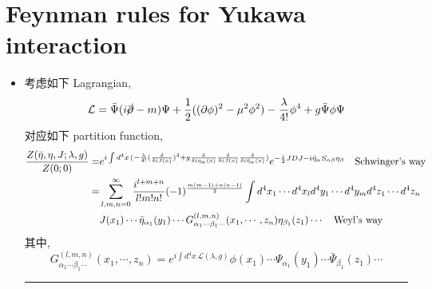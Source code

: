 \section{Feynman rules for Yukawa interaction}
\begin{itemize}
	\item 考虑如下 Lagrangian,
	\begin{equation}
		\mathcal{L} = \bar{\Psi} (i \cancel{\partial} - m) \Psi + \frac{1}{2} ((\partial \phi)^2 - \mu^2 \phi^2) - \frac{\lambda}{4!} \phi^4 + g \bar{\Psi} \phi \Psi
	\end{equation}
	对应如下 partition function,
	\begin{align}
		\frac{Z(\bar{\eta}, \eta, J; \lambda, g)}{Z(0; 0)} =& e^{i \int d^4 x \, (- \frac{\lambda}{4!} (\frac{\delta}{\delta i J(x)})^4 + g \frac{\delta}{\delta i \eta_\alpha(x)} \frac{\delta}{\delta i J(x)} \frac{\delta}{\delta i \bar{\eta}_\alpha(x)})} e^{- \frac{i}{2} J D J - i \bar{\eta}_\alpha S_{\alpha \beta} \eta_\beta} \quad \text{Schwinger's way} \notag \\
		=& \sum_{l, m, n = 0}^\infty \frac{i^{l + m + n}}{l! m! n!} (- 1)^{\frac{m (m - 1) + n (n - 1)}{2}} \int d^4 x_1 \cdots d^4 x_l d^4 y_1 \cdots d^4 y_m d^4 z_1 \cdots d^4 z_n \notag \\
		& J(x_1) \cdots \bar{\eta}_{\alpha_1}(y_1) \cdots G^{(l, m, n)}_{\alpha_1 \cdots \beta_1 \cdots}(x_1, \cdots, z_n) \eta_{\beta_1}(z_1) \cdots \quad \text{Weyl's way}
	\end{align}
	其中,
	\begin{equation}
		G^{(l, m, n)}_{\alpha_1 \cdots \beta_1 \cdots}(x_1, \cdots, z_n) = e^{i \int d^4 x \, \mathcal{L}(\lambda, g)} \phi(x_1) \cdots \Psi_{\alpha_1}(y_1) \cdots \bar{\Psi}_{\beta_1}(z_1) \cdots
	\end{equation}
	
	\noindent\rule[0.5ex]{\linewidth}{0.5pt} %
	

\end{itemize}
